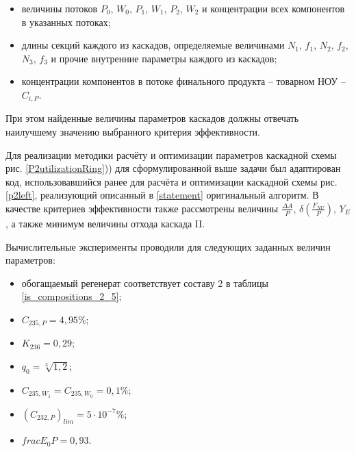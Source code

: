 \begin{itemize}
    \item величины потоков $P_0$, $W_0$, $P_1$, $W_1$, $P_2$, $W_2$ и концентрации всех компонентов в указанных потоках; 
    \item длины секций каждого из каскадов, определяемые величинами $N_1$, $f_1$, $N_2$, $f_2$, $N_3$, $f_3$ и прочие внутренние параметры каждого из каскадов;
    \item концентрации компонентов в потоке финального продукта -- товарном НОУ -- $C_{i,P}$.
\end{itemize}

При этом найденные величины параметров каскадов должны отвечать наилучшему значению выбранного критерия эффективности.  

Для реализации методики расчёту и оптимизации параметров каскадной схемы рис. \ref{P2utilizationRing})) для сформулированной выше задачи был адаптирован код, использовавшийся ранее для расчёта и оптимизации каскадной схемы рис. \ref{p2left}, реализующий описанный в \ref{statement} оригинальный алгоритм. В качестве критериев эффективности также рассмотрены величины $\frac{\Delta A}{P}$, $\delta(\frac{F_{NU}}{P})$, $Y_E$, а также минимум величины отхода каскада II.    

Вычислительные эксперименты проводили для следующих заданных величин параметров: 

\begin{itemize}
    \item обогащаемый регенерат соответствует составу 2 в таблицы \ref{is_compositions_2_5};
    \item $C_{235,{P}}=4,95\%$;
    \item $K_{236}=0,29$;
    \item $q_{0} = \sqrt[3]{1,2}$;
    \item $C_{235,{W_1}}=C_{235,{W_0}}=0,1\%$;
    \item ${(C_{232,P})}_{lim}=5\cdot10^{-7}\%$;
    \item $frac{{E_0}{P}}=0,93$.
\end{itemize}

